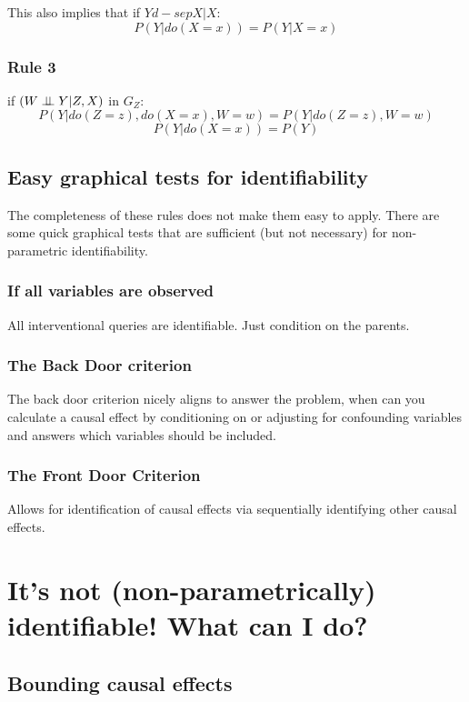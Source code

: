 \documentclass[11pt,a4paper]{article}
\begin{document}
This also implies that if $Y d-sep X|X$:
\begin{equation}
\label{eq:Do22}
P(Y|do(X=x)) = P(Y|X=x)
\end{equation}


\subsubsection{Rule 3}
if $(W \perp\!\!\!\perp Y | Z,X)$ in $G_{Z}$:
\begin{equation}
\label{eq:Do3}
P(Y|do(Z=z),do(X=x),W=w) = P(Y|do(Z=z),W=w)
\end{equation}
\begin{equation}
\label{eq:Do32}
P(Y|do(X=x)) = P(Y)
\end{equation}

\subsection{Easy graphical tests for identifiability}
The completeness of these rules does not make them easy to apply. There are some quick graphical tests that are sufficient (but not necessary) for non-parametric identifiability. 

\subsubsection{If all variables are observed}
All interventional queries are identifiable. Just condition on the parents.

\subsubsection{The Back Door criterion}
The back door criterion nicely aligns to answer the problem, when can you calculate a causal effect by conditioning on or adjusting for confounding variables and answers which variables should be included. 

\subsubsection{The Front Door Criterion}
Allows for identification of causal effects via sequentially identifying other causal effects.

\section{It's not (non-parametrically) identifiable! What can I do?}
\subsection{Bounding causal effects}
\end{document}
